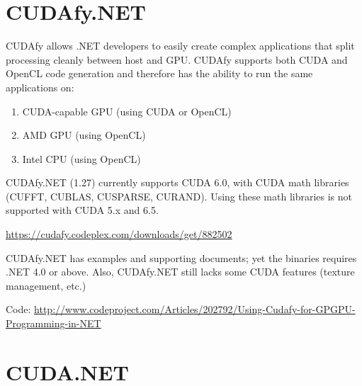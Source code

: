 \section{CUDAfy.NET}
\label{sec:CUDAfy}

CUDAfy allows .NET developers to easily create complex applications that split
processing cleanly between host and GPU. CUDAfy supports both CUDA and OpenCL
code generation and therefore has the ability to run the same applications on:
\begin{enumerate}
  \item CUDA-capable GPU (using CUDA or OpenCL)
  \item AMD GPU (using OpenCL)
  \item Intel CPU (using OpenCL)
\end{enumerate}

CUDAfy.NET (1.27) currently supports CUDA 6.0, with CUDA math libraries (CUFFT,
CUBLAS, CUSPARSE, CURAND). Using these math libraries is not supported with CUDA
5.x and 6.5.

\url{https://cudafy.codeplex.com/downloads/get/882502}

CUDAfy.NET has examples and supporting documents; yet the binaries requires .NET
4.0 or above. Also, CUDAfy.NET still lacks some CUDA features (texture
management, etc.)

Code:
\url{http://www.codeproject.com/Articles/202792/Using-Cudafy-for-GPGPU-Programming-in-NET}

\section{CUDA.NET}
\label{sec:CUDA.NET}

